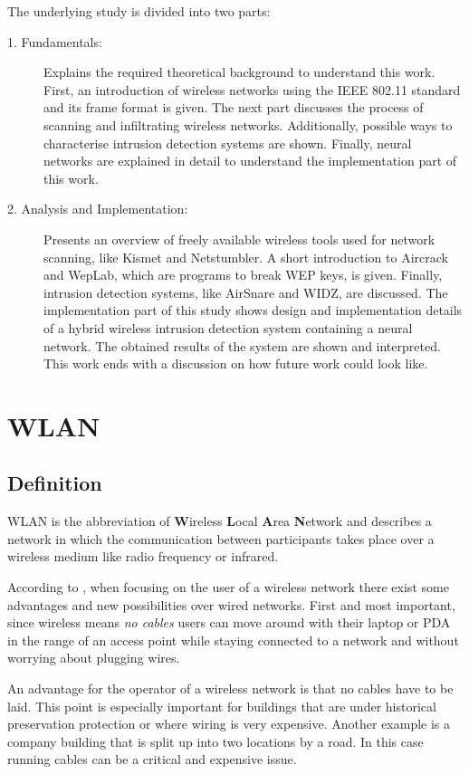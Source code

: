 The underlying study is divided into two parts:

\begin{description}
    \item[1. Fundamentals:] Explains the required theoretical background to understand this work. First, an introduction of wireless networks using the IEEE 802.11 standard and its frame format is given. The next part discusses the process of scanning and infiltrating wireless networks. Additionally, possible ways to characterise intrusion detection systems are shown. Finally, neural networks are explained in detail to understand the implementation part of this work.
	\item[2. Analysis and Implementation:] Presents an overview of freely available wireless tools used for network scanning, like Kismet and Netstumbler. A short introduction to Aircrack and WepLab, which are programs to break WEP keys, is given. Finally, intrusion detection systems, like AirSnare and WIDZ, are discussed. The implementation part of this study shows design and implementation details of a hybrid wireless intrusion detection system containing a neural network. The obtained results of the system are shown and interpreted. This work ends with a discussion on how future work could look like.
\end{description}

\chapter{WLAN}

\section{Definition}

WLAN is the abbreviation of {\bf W}ireless {\bf L}ocal {\bf A}rea {\bf N}etwork and describes a network in which the communication between participants takes place over a wireless medium like radio frequency or infrared.

According to \cite[p.1-3]{80211wireless}, when focusing on the user of a wireless network there exist some advantages and new possibilities over wired networks. First and most important, since wireless means {\em no cables} users can move around with their laptop or PDA in the range of an access point while staying connected to a network and without worrying about plugging wires.

An advantage for the operator of a wireless network is that no cables have to be laid. This point is especially important for buildings that are under historical preservation protection or where wiring is very expensive. Another example is a company building that is split up into two locations by a road. In this case running cables can be a critical and expensive issue.


